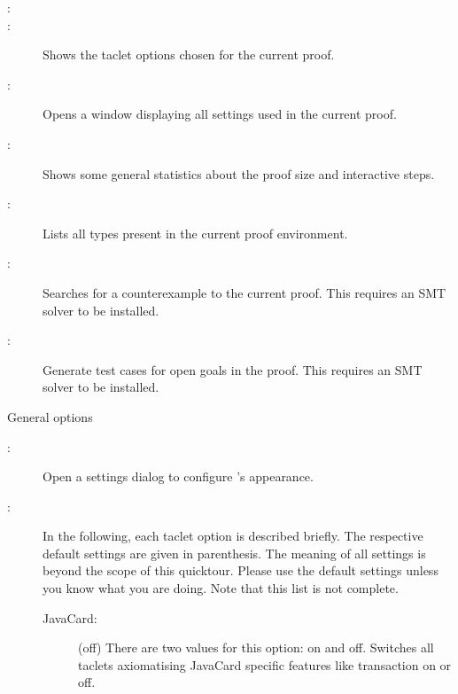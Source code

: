 \begin{description}
\begin{description}
  \item[:]

  \item[:] Shows the taclet options
    chosen for the current proof.

  \item[:] Opens a window displaying all settings used in the current proof.

  \item[:] Shows some general statistics
    about the proof size and interactive steps.

  \item[:] Lists all types present in the
    current proof environment. 
    
  \item[:] Searches for a counterexample to the current proof. This requires an SMT solver to be installed.
  
  \item[:] Generate test cases for open goals in the proof. This requires an SMT solver to be installed.

  \end{description}
  
\item[\mea{Options}] General options


  \begin{description}
  	
  \item[:] Open a settings dialog to configure \KeY's appearance.
  \item[:] In the following, each taclet
    option is described briefly. The respective default settings are
    given in parenthesis. The meaning of all settings is beyond the
    scope of this quicktour. Please use the default settings unless
    you know what you are doing.
    Note that this list is not complete.

    \begin{description}
 \item[JavaCard:] (\textsf{off}) There are two values for this option:
 \textsf{on} and \textsf{off}. Switches all
 taclets axiomatising JavaCard specific features like
 transaction on or off. 


\end{description}
\end{description}
\end{description}
